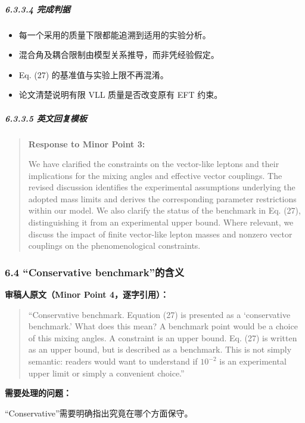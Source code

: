 \documentclass[
]{article}
\providecommand{\tightlist}{%
  \setlength{\itemsep}{0pt}\setlength{\parskip}{0pt}}
\begin{document}
\subparagraph{6.3.3.4 完成判据}\label{ux5b8cux6210ux5224ux636e-2}

\begin{itemize}
\tightlist
\item
  每一个采用的质量下限都能追溯到适用的实验分析。
\item
  混合角及耦合限制由模型关系推导，而非凭经验假定。
\item
  Eq. (27) 的基准值与实验上限不再混淆。
\item
  论文清楚说明有限 VLL 质量是否改变原有 EFT 约束。
\end{itemize}

\subparagraph{6.3.3.5
英文回复模板}\label{ux82f1ux6587ux56deux590dux6a21ux677f-2}

\begin{quote}
\textbf{Response to Minor Point 3:}

We have clarified the constraints on the vector-like leptons and their
implications for the mixing angles and effective vector couplings. The
revised discussion identifies the experimental assumptions underlying
the adopted mass limits and derives the corresponding parameter
restrictions within our model. We also clarify the status of the
benchmark in Eq. (27), distinguishing it from an experimental upper
bound. Where relevant, we discuss the impact of finite vector-like
lepton masses and nonzero vector couplings on the phenomenological
constraints.
\end{quote}

\subsubsection{6.4 ``Conservative
benchmark''的含义}\label{conservative-benchmarkux7684ux542bux4e49}

\textbf{审稿人原文（Minor Point 4，逐字引用）：}

\begin{quote}
``Conservative benchmark. Equation (27) is presented as a `conservative
benchmark.' What does this mean? A benchmark point would be a choice of
this mixing angles. A constraint is an upper bound. Eq. (27) is written
as an upper bound, but is described as a benchmark. This is not simply
semantic: readers would want to understand if \(10^{-2}\) is an
experimental upper limit or simply a convenient choice.''
\end{quote}

\textbf{需要处理的问题：}

``Conservative''需要明确指出究竟在哪个方面保守。
\end{document}
